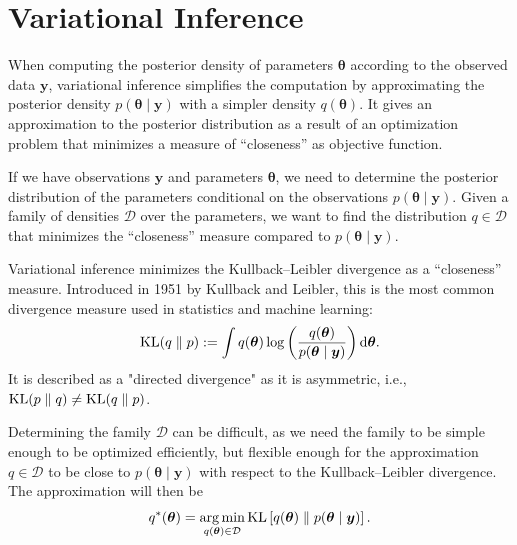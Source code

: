 \documentclass[a4paper, 11pt]{report}
\numberwithin{equation}{chapter}
\DeclareMathOperator*{\argmin}{arg\,min}
\DeclareMathOperator*{\KL}{{\rm KL}}
\begin{document}
\chapter{Variational Inference}
When computing the posterior density of parameters $\boldsymbol{\theta}$ according to the observed data $\boldsymbol{y}$, variational inference simplifies the computation by approximating the posterior density $p(\boldsymbol{\theta}\mid \boldsymbol{y})$ with a simpler density $q(\boldsymbol{\theta})$. It gives an approximation to the posterior distribution as a result of an optimization problem that minimizes a measure of ``closeness'' as objective function.

If we have observations $\boldsymbol{y}$ and parameters $\boldsymbol{\theta}$, we need to determine the posterior distribution of the parameters conditional on the observations $p(\boldsymbol{\theta} \mid \boldsymbol{y})$. Given a family of densities $\mathcal{D}$ over the parameters, we want to find the distribution $q \in \mathcal{D}$ that minimizes the ``closeness'' measure compared to $p(\boldsymbol{\theta} \mid \boldsymbol{y})$.

Variational inference minimizes the Kullback--Leibler divergence as a ``closeness'' measure. Introduced in 1951 by Kullback and Leibler\cite{kl51}, this is the most common divergence measure used in statistics and machine learning:
\begin{equation*}
\KL(q\parallel p) := \int q(\boldsymbol{\theta})\log \left(\frac{q(\boldsymbol{\theta})}{p(\boldsymbol{\theta} \mid \boldsymbol{y})}\right) \mathrm{d}\boldsymbol{\theta}.
\end{equation*} 
It is described as a "directed divergence" as it is asymmetric, i.e., $\KL(p\parallel q) \neq \KL(q \parallel p)$.

Determining the family $\mathcal{D}$ can be difficult, as we need the family to be simple enough to be optimized efficiently, but flexible enough for the approximation $q \in \mathcal{D}$ to be close to $p(\boldsymbol{\theta} \mid \boldsymbol{y})$ with respect to the Kullback--Leibler divergence. The approximation will then be
\begin{equation*}
q^*(\boldsymbol{\theta} ) = \argmin_{q(\boldsymbol{\theta}) \in \mathcal{D}} \KL\left[ q(\boldsymbol{\theta}) \parallel p(\boldsymbol{\theta} \mid \boldsymbol{y})\right].
\end{equation*}
\end{document}
